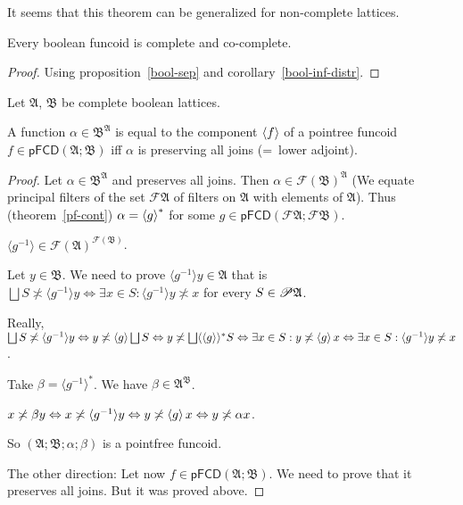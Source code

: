 \begin{rem}
It seems that this theorem can be generalized for non-complete lattices.
\end{rem}

\begin{cor}
  Every boolean funcoid is complete and co-complete.
\end{cor}

\begin{proof}
Using proposition~\ref{bool-sep} and corollary~\ref{bool-inf-distr}.
\end{proof}

\begin{thm}\label{bfunc-is-adj}
  Let $\mathfrak{A}$, $\mathfrak{B}$ be complete boolean lattices.

  A function $\alpha \in \mathfrak{B}^{\mathfrak{A}}$ is equal to the
  component $\left\langle f\right\rangle$ of a pointree funcoid $f \in \mathsf{pFCD}
  (\mathfrak{A}; \mathfrak{B})$ iff $\alpha$ is preserving all joins (=~lower
  adjoint).
\end{thm}

\begin{proof}
  Let $\alpha \in \mathfrak{B}^{\mathfrak{A}}$ and preserves all joins. Then
  $\alpha \in \mathscr{F} (\mathfrak{B})^{\mathfrak{A}}$ (We equate principal
  filters of the set $\mathscr{F} \mathfrak{A}$ of filters on $\mathfrak{A}$
  with elements of $\mathfrak{A}$). Thus (theorem~\ref{pf-cont}) $\alpha = \left\langle g\right\rangle ^{\ast}$
  for some $g \in \mathsf{pFCD} \left( \mathscr{F} \mathfrak{A}; \mathscr{F}
  \mathfrak{B} \right)$.
  
  $\langle g^{- 1} \rangle \in \mathscr{F} (\mathfrak{A})^{\mathscr{F}
  (\mathfrak{B})}$.
  
  Let $y \in \mathfrak{B}$. We need to prove $\langle g^{- 1} \rangle y \in
  \mathfrak{A}$ that is $\bigsqcup S \nasymp \langle g^{- 1} \rangle y
  \Leftrightarrow \exists x \in S : \langle g^{- 1} \rangle y \nasymp x$ for
  every $S \in \mathscr{P} \mathfrak{A}$.
  
  Really, $\bigsqcup S \nasymp \langle g^{- 1} \rangle y \Leftrightarrow y
  \nasymp \supfun{g} \bigsqcup S \Leftrightarrow y \nasymp \bigsqcup
  \langle \supfun{g} \rangle^{\ast} S \Leftrightarrow \exists x \in S :
  y \nasymp \supfun{g} x \Leftrightarrow \exists x \in S : \langle g^{-
  1} \rangle y \nasymp x$.
  
  Take $\beta = \langle g^{- 1} \rangle^{\ast}$. We have $\beta \in
  \mathfrak{A}^{\mathfrak{B}}$.
  
  $x \not\asymp \beta y \Leftrightarrow x \not\asymp \langle g^{- 1} \rangle y
  \Leftrightarrow y \not\asymp \left\langle g\right\rangle x \Leftrightarrow y \not\asymp
  \alpha x$.
  
  So $(\mathfrak{A}; \mathfrak{B}; \alpha ; \beta)$ is a pointfree funcoid.
  
  The other direction: Let now $f \in \mathsf{pFCD} (\mathfrak{A};
  \mathfrak{B})$. We need to prove that it preserves all joins. But it was
  proved above.
\end{proof}

